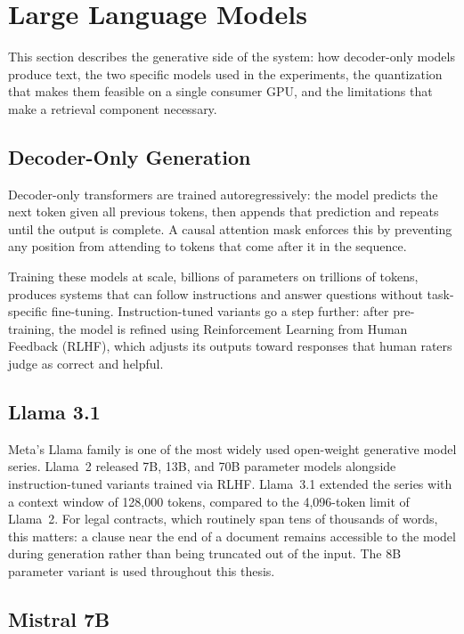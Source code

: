 \section{Large Language Models}

This section describes the generative side of the system: how decoder-only models produce text, the two specific models used in the experiments, the quantization that makes them feasible on a single consumer GPU, and the limitations that make a retrieval component necessary.

\subsection{Decoder-Only Generation}

Decoder-only transformers are trained autoregressively: the model 
predicts the next token given all previous tokens, then appends that 
prediction and repeats until the output is complete. A causal attention 
mask enforces this by preventing any position from attending to tokens 
that come after it in the sequence.

Training these models at scale, billions of parameters on trillions 
of tokens, produces systems that can follow instructions and answer 
questions without task-specific fine-tuning. Instruction-tuned variants 
go a step further: after pre-training, the model is refined using 
Reinforcement Learning from Human Feedback (RLHF), which adjusts its 
outputs toward responses that human raters judge as correct and helpful.

\subsection{Llama 3.1}

Meta's Llama family is one of the most widely used open-weight 
generative model series. Llama~2 \cite{touvron2023llama2} released 
7B, 13B, and 70B parameter models alongside instruction-tuned variants 
trained via RLHF. Llama~3.1 \cite{meta2024llama3} extended the series 
with a context window of 128,000 tokens, compared to the 4,096-token 
limit of Llama~2. For legal contracts, which routinely span tens of 
thousands of words, this matters: a clause near the end of a document 
remains accessible to the model during generation rather than being 
truncated out of the input. The 8B parameter variant is used throughout 
this thesis.

\subsection{Mistral 7B}

